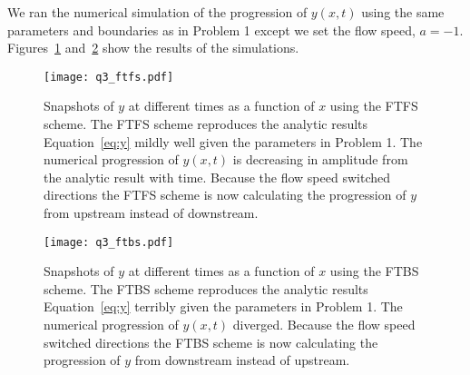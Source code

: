 \documentclass{article}
\begin{document}
\begin{homeworkProblem}

    We ran the numerical simulation of the progression of $y(x,t)$ using the
    same parameters and boundaries as in Problem 1 except we set the flow
    speed, $a = -1$.  Figures~\ref{fig:q3_ftfs} and~\ref{fig:q3_ftbs} show the
    results of the simulations.

    \begin{figure}[!ht]
    \begin{center}
        \texttt{[image: q3\_ftfs.pdf]} %

        \caption{\label{fig:q3_ftfs} Snapshots of $y$ at different times as a
        function of $x$ using the FTFS scheme. The FTFS scheme reproduces the
        analytic results Equation~\ref{eq:y} mildly well given the parameters in
        Problem 1. The numerical progression of $y(x,t)$ is decreasing in
        amplitude from the analytic result with time. Because the flow speed
        switched directions the FTFS scheme is now calculating the progression
        of $y$ from upstream instead of downstream.}

    \end{center}
    \end{figure}
    
    \begin{figure}[!ht]
    \begin{center}
        \texttt{[image: q3\_ftbs.pdf]} %

        \caption{\label{fig:q3_ftbs}Snapshots of $y$ at different times as a
        function of $x$ using the FTBS scheme. The FTBS scheme reproduces the
        analytic results Equation~\ref{eq:y} terribly given the parameters in
        Problem 1. The numerical progression of $y(x,t)$ diverged. Because the
        flow speed switched directions the FTBS scheme is now calculating the
        progression of $y$ from downstream instead of upstream.}

    \end{center}
    \end{figure}



\end{homeworkProblem}
\clearpage
\end{document}
